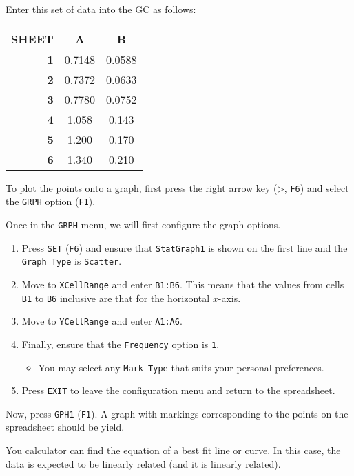 \documentclass[a5paper,draft]{memoir}
\def\code#1{\texttt{#1}}
\begin{document}
\pagebreak
Enter this set of data into the GC as follows:

\begin{center}
	\setlength{\tabcolsep}{10pt}
	\renewcommand{\arraystretch}{1.2}
	\begin{tabular}{|r|c|c|}
		\hline
		{\tiny SHEET}& \textbf{A}	& \textbf{B} \\
		\hline
		\textbf{1}	& 0.7148		& 0.0588 \\
		\hline
		\textbf{2}	& 0.7372		& 0.0633 \\
		\hline
		\textbf{3}	& 0.7780		& 0.0752 \\
		\hline
		\textbf{4}	& 1.058			& 0.143 \\
		\hline
		\textbf{5}	& 1.200			& 0.170 \\
		\hline
		\textbf{6}	& 1.340			& 0.210 \\
		\hline
	\end{tabular}
\end{center}

To plot the points onto a graph, first press the right arrow key ($\triangleright$, \code{F6}) and select the \code{GRPH} option (\code{F1}).

Once in the \code{GRPH} menu, we will first configure the graph options. 
\begin{enumerate}
	\item Press \code{SET} (\code{F6}) and ensure that \code{StatGraph1} is shown on the first line and the \code{Graph Type} is \code{Scatter}.
	\item Move to \code{XCellRange} and enter \code{B1:B6}. This means that the values from cells \code{B1} to \code{B6} inclusive are that for the horizontal $x$-axis.
	\item Move to \code{YCellRange} and enter \code{A1:A6}.
	\item Finally, ensure that the \code{Frequency} option is \code{1}.
	\begin{itemize}
		\item You may select any \code{Mark Type} that suits your personal preferences.
	\end{itemize}
	\item Press \code{EXIT} to leave the configuration menu and return to the spreadsheet.
\end{enumerate}

Now, press \code{GPH1} (\code{F1}). A graph with markings corresponding to the points on the spreadsheet should be yield.

You calculator can find the equation of a best fit line or curve. In this case, the data is expected to be linearly related (and it is linearly related).
\end{document}
